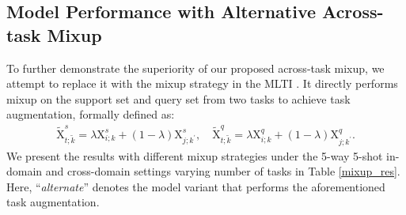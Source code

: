 \subsection{Model Performance with Alternative Across-task Mixup}
\label{alternative_mixup}
To further demonstrate the superiority of our proposed across-task mixup, we attempt to replace it with the mixup strategy in the MLTI \cite{yao2021meta}. It directly performs mixup on the support set and query set from two tasks to achieve task augmentation, formally defined as:
\begin{equation}
    \begin{aligned}
        \tilde{\mathrm{X}}_{t;\tilde{k}}^s\!=\!\lambda\mathrm{X}_{i;k}^s\!+\!(1\!-\!\lambda)\mathrm{X}_{j;k^\prime}^s, \quad
        \tilde{\mathrm{X}}_{t;\tilde{k}}^q\!=\!\lambda\mathrm{X}_{i;k}^q\!+\!(1\!-\!\lambda)\mathrm{X}_{j;k^\prime}^q.
    \end{aligned}
\end{equation}
We present the results with different mixup strategies under the 5-way 5-shot in-domain and cross-domain settings varying number of tasks in Table \ref{mixup_res}. Here, ``\textit{alternate}'' denotes the model variant that  performs the aforementioned task augmentation.

